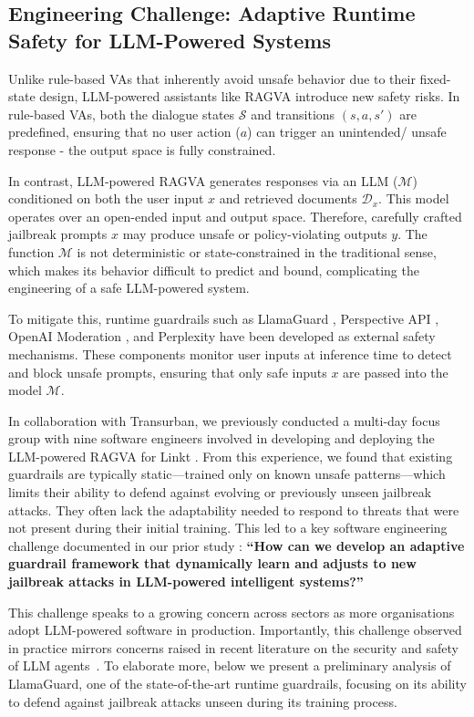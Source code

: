 \subsection{Engineering Challenge: Adaptive Runtime Safety for LLM-Powered Systems}
Unlike rule-based VAs that inherently avoid unsafe behavior due to their fixed-state design, LLM-powered assistants like RAGVA introduce new safety risks. In rule-based VAs, both the dialogue states $\mathcal{S}$ and transitions $(s, a, s')$ are predefined, ensuring that no user action ($a$) can trigger an unintended/ unsafe response - the output space is fully constrained.

In contrast, LLM-powered RAGVA generates responses via an LLM ($\mathcal{M}$) conditioned on both the user input $x$ and retrieved documents $\mathcal{D}_x$. This model operates over an open-ended input and output space. Therefore, carefully crafted jailbreak prompts $x$ may produce unsafe or policy-violating outputs $y$. The function $\mathcal{M}$ is not deterministic or state-constrained in the traditional sense, which makes its behavior difficult to predict and bound, complicating the engineering of a safe LLM-powered system.

To mitigate this, runtime guardrails such as LlamaGuard \cite{inan2023llama}, Perspective API \cite{lees2022new}, OpenAI Moderation \cite{markov2023holistic}, and Perplexity \cite{alon2023detecting} have been developed as external safety mechanisms. These components monitor user inputs at inference time to detect and block unsafe prompts, ensuring that only safe inputs $x$ are passed into the model $\mathcal{M}$.

In collaboration with Transurban, we previously conducted a multi-day focus group with nine software engineers involved in developing and deploying the LLM-powered RAGVA for Linkt \cite{yang2025ragva}. From this experience, we found that existing guardrails are typically static—trained only on known unsafe patterns—which limits their ability to defend against evolving or previously unseen jailbreak attacks. They often lack the adaptability needed to respond to threats that were not present during their initial training. This led to a key software engineering challenge documented in our prior study \cite{yang2025ragva}: \textbf{``How can we develop an adaptive guardrail framework that dynamically learn and adjusts to new jailbreak attacks in LLM-powered intelligent systems?''}

This challenge speaks to a growing concern across sectors as more organisations adopt LLM-powered software in production.
Importantly, this challenge observed in practice mirrors concerns raised in recent literature on the security and safety of LLM agents~\cite{bengio2024managing, hassan2024rethinking, yao2024survey, gan2024navigating}.
To elaborate more, below we present a preliminary analysis of LlamaGuard, one of the state-of-the-art runtime guardrails, focusing on its ability to defend against jailbreak attacks unseen during its training process.

